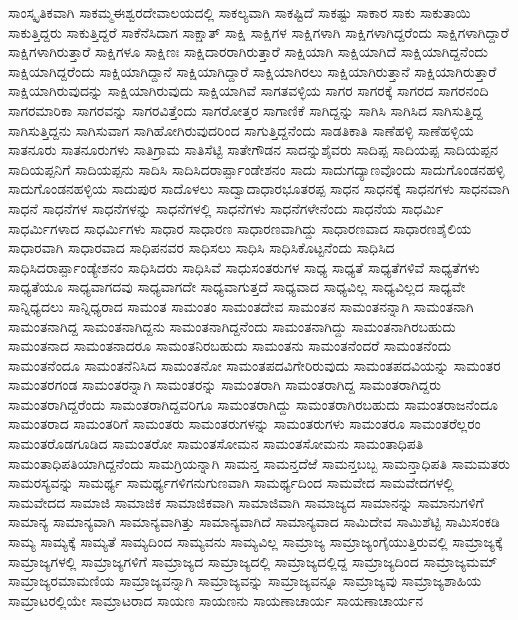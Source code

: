 {ಸಾಂಸ್ಕೃತಿಕವಾಗಿ
ಸಾಕಮ್ಮಈಶ್ವರದೇವಾಲಯದಲ್ಲಿ
ಸಾಕಲ್ಯವಾಗಿ
ಸಾಕಷ್ಟಿದೆ
ಸಾಕಷ್ಟು
ಸಾಕಾರ
ಸಾಕು
ಸಾಕುತಾಯಿ
ಸಾಕುತ್ತಿದ್ದರು
ಸಾಕುತ್ತಿದ್ದರೆ
ಸಾಕೆನೆಸಿದಾಗ
ಸಾಕ್ಷಾತ್
ಸಾಕ್ಷಿ
ಸಾಕ್ಷಿಗಳ
ಸಾಕ್ಷಿಗಳಾಗಿ
ಸಾಕ್ಷಿಗಳಾಗಿದ್ದರೆಂದು
ಸಾಕ್ಷಿಗಳಾಗಿದ್ದಾರೆ
ಸಾಕ್ಷಿಗಳಾಗಿರುತ್ತಾರೆ
ಸಾಕ್ಷಿಗಳೂ
ಸಾಕ್ಷಿಣಃ
ಸಾಕ್ಷಿದಾರರಾಗಿರುತ್ತಾರೆ
ಸಾಕ್ಷಿಯಾಗಿ
ಸಾಕ್ಷಿಯಾಗಿದೆ
ಸಾಕ್ಷಿಯಾಗಿದ್ದನೆಂದು
ಸಾಕ್ಷಿಯಾಗಿದ್ದರೆಂದು
ಸಾಕ್ಷಿಯಾಗಿದ್ದಾನೆ
ಸಾಕ್ಷಿಯಾಗಿದ್ದಾರೆ
ಸಾಕ್ಷಿಯಾಗಿರಲು
ಸಾಕ್ಷಿಯಾಗಿರುತ್ತಾನೆ
ಸಾಕ್ಷಿಯಾಗಿರುತ್ತಾರೆ
ಸಾಕ್ಷಿಯಾಗಿರುವುದನ್ನು
ಸಾಕ್ಷಿಯಾಗಿರುವುದು
ಸಾಕ್ಷಿಯಾಗಿವೆ
ಸಾಗತವಳ್ಳಿಯ
ಸಾಗರ
ಸಾಗರಕ್ಕೆ
ಸಾಗರದ
ಸಾಗರನಂದಿ
ಸಾಗರಮಾರಿಕಾ
ಸಾಗರವನ್ನು
ಸಾಗರವಿತ್ತೆಂದು
ಸಾಗರೋತ್ತರ
ಸಾಗಾಣಿಕೆ
ಸಾಗಿದ್ದನ್ನು
ಸಾಗಿಸಿ
ಸಾಗಿಸಿದ
ಸಾಗಿಸುತ್ತಿದ್ದ
ಸಾಗಿಸುತ್ತಿದ್ದನು
ಸಾಗಿಸುವಾಗ
ಸಾಗಿಹೋಗಿರುವುದರಿಂದ
ಸಾಗುತ್ತಿದ್ದನೆಂದು
ಸಾಡತಿಕಾತಿ
ಸಾಣೆಹಳ್ಳಿ
ಸಾಣೆಹಳ್ಳಿಯ
ಸಾತನೂರು
ಸಾತನೂರುಗಳು
ಸಾತಿಗ್ರಾಮ
ಸಾತಿಸೆಟ್ಟಿ
ಸಾತೇಗೌಡನ
ಸಾದನ್ನುಶೈವರು
ಸಾದಿಪ್ಪ
ಸಾದಿಯಪ್ಪ
ಸಾದಿಯಪ್ಪನ
ಸಾದಿಯಪ್ಪನಿಗೆ
ಸಾದಿಯಪ್ಪನು
ಸಾದಿಸಿ
ಸಾದಿಸಿದರಾರ್ಪ್ಪಾಂಡೇಶನಂ
ಸಾದು
ಸಾದುಗದ್ಯಾಣವೊಂದು
ಸಾದುಗೊಂಡನಹಳ್ಳಿ
ಸಾದುಗೊಂಡನಹಳ್ಳಿಯ
ಸಾದುಪುರ
ಸಾದೊಳಲು
ಸಾದ್ವಾದಾಧಾರಭೂತರಪ್ಪ
ಸಾಧನ
ಸಾಧನಕ್ಕೆ
ಸಾಧನಗಳು
ಸಾಧನವಾಗಿ
ಸಾಧನೆ
ಸಾಧನೆಗಳ
ಸಾಧನೆಗಳನ್ನು
ಸಾಧನೆಗಳಲ್ಲಿ
ಸಾಧನೆಗಳು
ಸಾಧನೆಗಳೇನೆಂದು
ಸಾಧನೆಯ
ಸಾಧರ್ಮಿ
ಸಾಧರ್ಮಿಗಳಾದ
ಸಾಧರ್ಮಿಗಳು
ಸಾಧಾರ
ಸಾಧಾರಣ
ಸಾಧಾರಣವಾಗಿದ್ದು
ಸಾಧಾರಣವಾದ
ಸಾಧಾರಣಶೈಲಿಯ
ಸಾಧಾರವಾಗಿ
ಸಾಧಾರವಾದ
ಸಾಧಿಪನವರ
ಸಾಧಿಸಲು
ಸಾಧಿಸಿ
ಸಾಧಿಸಿಕೊಟ್ಟನೆಂದು
ಸಾಧಿಸಿದ
ಸಾಧಿಸಿದರಾರ್ಪ್ಪಾಂಡ್ಯೇಶನಂ
ಸಾಧಿಸಿದರು
ಸಾಧಿಸಿವೆ
ಸಾಧುಸಂತರುಗಳ
ಸಾಧ್ಯ
ಸಾಧ್ಯತೆ
ಸಾಧ್ಯತೆಗಳಿವೆ
ಸಾಧ್ಯತೆಗಳು
ಸಾಧ್ಯತೆಯೂ
ಸಾಧ್ಯವಾಗದವು
ಸಾಧ್ಯವಾಗದೇ
ಸಾಧ್ಯವಾಗುತ್ತದೆ
ಸಾಧ್ಯವಾದ
ಸಾಧ್ಯವಿಲ್ಲ
ಸಾಧ್ಯವಿಲ್ಲದ
ಸಾಧ್ಯವೇ
ಸಾನ್ನಿಧ್ಯದಲು
ಸಾನ್ನಿಧ್ಯರಾದ
ಸಾಮಂತ
ಸಾಮಂತಂ
ಸಾಮಂತದೇವ
ಸಾಮಂತನ
ಸಾಮಂತನನ್ನಾಗಿ
ಸಾಮಂತನಾಗಿ
ಸಾಮಂತನಾಗಿದ್ದ
ಸಾಮಂತನಾಗಿದ್ದನು
ಸಾಮಂತನಾಗಿದ್ದನೆಂದು
ಸಾಮಂತನಾಗಿದ್ದು
ಸಾಮಂತನಾಗಿರಬಹುದು
ಸಾಮಂತನಾದ
ಸಾಮಂತನಾದರೂ
ಸಾಮಂತನಿರಬಹುದು
ಸಾಮಂತನು
ಸಾಮಂತನೆಂದರೆ
ಸಾಮಂತನೆಂದು
ಸಾಮಂತನೆಂದೂ
ಸಾಮಂತನೆನಿಸಿದ
ಸಾಮಂತನೋ
ಸಾಮಂತಪದವಿಗೇರಿರುವುದು
ಸಾಮಂತಪದವಿಯನ್ನು
ಸಾಮಂತರ
ಸಾಮಂತರಗಂಡ
ಸಾಮಂತರನ್ನಾಗಿ
ಸಾಮಂತರನ್ನು
ಸಾಮಂತರಾಗಿ
ಸಾಮಂತರಾಗಿದ್ದ
ಸಾಮಂತರಾಗಿದ್ದರು
ಸಾಮಂತರಾಗಿದ್ದರೆಂದು
ಸಾಮಂತರಾಗಿದ್ದವರಿಗೂ
ಸಾಮಂತರಾಗಿದ್ದು
ಸಾಮಂತರಾಗಿರಬಹುದು
ಸಾಮಂತರಾಜನೆಂದೂ
ಸಾಮಂತರಾದ
ಸಾಮಂತರಿಗೆ
ಸಾಮಂತರು
ಸಾಮಂತರುಗಳನ್ನು
ಸಾಮಂತರುಗಳು
ಸಾಮಂತರೂ
ಸಾಮಂತರೆಲ್ಲರಂ
ಸಾಮಂತರೊಡಗೂಡಿದ
ಸಾಮಂತರೋ
ಸಾಮಂತಸೋಮನ
ಸಾಮಂತಸೋಮನು
ಸಾಮಂತಾಧಿಪತಿ
ಸಾಮಂತಾಧಿಪತಿಯಾಗಿದ್ದನೆಂದು
ಸಾಮಗ್ರಿಯನ್ನಾಗಿ
ಸಾಮನ್ತ
ಸಾಮನ್ತದೆಱೆ
ಸಾಮನ್ತಬಬ್ಬ
ಸಾಮನ್ತಾಧಿಪತಿ
ಸಾಮಮತರು
ಸಾಮರಸ್ಯವನ್ನು
ಸಾಮರ್ಥ್ಯ
ಸಾಮರ್ಥ್ಯಗಳಿಗನುಗುಣವಾಗಿ
ಸಾಮರ್ಥ್ಯದಿಂದ
ಸಾಮವೇದ
ಸಾಮವೇದಗಳಲ್ಲಿ
ಸಾಮವೇದದ
ಸಾಮಾಜಿ
ಸಾಮಾಜಿಕ
ಸಾಮಾಜಿಕವಾಗಿ
ಸಾಮಾಜಿವಾಗಿ
ಸಾಮಾಜ್ಯದ
ಸಾಮಾನನ್ನು
ಸಾಮಾನುಗಳಿಗೆ
ಸಾಮಾನ್ಯ
ಸಾಮಾನ್ಯವಾಗಿ
ಸಾಮಾನ್ಯವಾಗಿತ್ತು
ಸಾಮಾನ್ಯವಾಗಿದೆ
ಸಾಮಾನ್ಯವಾದ
ಸಾಮಿದೇವ
ಸಾಮಿಶೆಟ್ಟಿ
ಸಾಮಿಸಂಕಡಿ
ಸಾಮ್ಯ
ಸಾಮ್ಯಕ್ಕೆ
ಸಾಮ್ಯತೆ
ಸಾಮ್ಯದಿಂದ
ಸಾಮ್ಯವನು
ಸಾಮ್ಯವಿಲ್ಲ
ಸಾಮ್ರಾಜ್ಯ
ಸಾಮ್ರಾಜ್ಯಂಗೈಯುತ್ತಿರುವಲ್ಲಿ
ಸಾಮ್ರಾಜ್ಯಕ್ಕೆ
ಸಾಮ್ರಾಜ್ಯಗಳಲ್ಲಿ
ಸಾಮ್ರಾಜ್ಯಗಳಿಗೆ
ಸಾಮ್ರಾಜ್ಯದ
ಸಾಮ್ರಾಜ್ಯದಲ್ಲಿ
ಸಾಮ್ರಾಜ್ಯದಲ್ಲಿದ್ದ
ಸಾಮ್ರಾಜ್ಯದಿಂದ
ಸಾಮ್ರಾಜ್ಯಮಮ್
ಸಾಮ್ರಾಜ್ಯರಮಾಮಣಿಯ
ಸಾಮ್ರಾಜ್ಯವನ್ನಾಗಿ
ಸಾಮ್ರಾಜ್ಯವನ್ನು
ಸಾಮ್ರಾಜ್ಯವನ್ನೂ
ಸಾಮ್ರಾಜ್ಯವು
ಸಾಮ್ರಾಜ್ಯಶಾಹಿಯ
ಸಾಮ್ರಾಟರಲ್ಲಿಯೇ
ಸಾಮ್ರಾಟರಾದ
ಸಾಯಣ
ಸಾಯಣನು
ಸಾಯಣಾಚಾರ್ಯ
ಸಾಯಣಾಚಾರ್ಯನ
}

